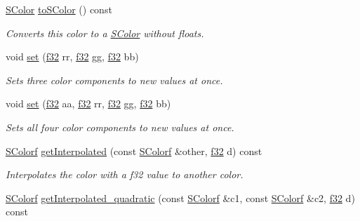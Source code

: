 \begin{DoxyCompactItemize}
\mbox{\label{classirr_1_1video_1_1SColorf_ac2f8bda88252139531ce041819aabee6}} 
\hyperlink{classirr_1_1video_1_1SColor}{S\+Color} \hyperlink{classirr_1_1video_1_1SColorf_ac2f8bda88252139531ce041819aabee6}{to\+S\+Color} () const
\begin{DoxyCompactList}\small\item\em Converts this color to a \hyperlink{classirr_1_1video_1_1SColor}{S\+Color} without floats. \end{DoxyCompactList}\item 
void \hyperlink{classirr_1_1video_1_1SColorf_a99fe5c7d261d288d9afe301d4b90d41c}{set} (\hyperlink{namespaceirr_a0277be98d67dc26ff93b1a6a1d086b07}{f32} rr, \hyperlink{namespaceirr_a0277be98d67dc26ff93b1a6a1d086b07}{f32} gg, \hyperlink{namespaceirr_a0277be98d67dc26ff93b1a6a1d086b07}{f32} bb)
\begin{DoxyCompactList}\small\item\em Sets three color components to new values at once. \end{DoxyCompactList}\item 
void \hyperlink{classirr_1_1video_1_1SColorf_ae5a082e95ff2631651356f8a6daa2e73}{set} (\hyperlink{namespaceirr_a0277be98d67dc26ff93b1a6a1d086b07}{f32} aa, \hyperlink{namespaceirr_a0277be98d67dc26ff93b1a6a1d086b07}{f32} rr, \hyperlink{namespaceirr_a0277be98d67dc26ff93b1a6a1d086b07}{f32} gg, \hyperlink{namespaceirr_a0277be98d67dc26ff93b1a6a1d086b07}{f32} bb)
\begin{DoxyCompactList}\small\item\em Sets all four color components to new values at once. \end{DoxyCompactList}\item 
\hyperlink{classirr_1_1video_1_1SColorf}{S\+Colorf} \hyperlink{classirr_1_1video_1_1SColorf_a43850552a0805bcdb8c246613d251cfb}{get\+Interpolated} (const \hyperlink{classirr_1_1video_1_1SColorf}{S\+Colorf} \&other, \hyperlink{namespaceirr_a0277be98d67dc26ff93b1a6a1d086b07}{f32} d) const
\begin{DoxyCompactList}\small\item\em Interpolates the color with a f32 value to another color. \end{DoxyCompactList}\item 
\hyperlink{classirr_1_1video_1_1SColorf}{S\+Colorf} \hyperlink{classirr_1_1video_1_1SColorf_ae75c258ce246833bde2cbeb6c1f786a5}{get\+Interpolated\+\_\+quadratic} (const \hyperlink{classirr_1_1video_1_1SColorf}{S\+Colorf} \&c1, const \hyperlink{classirr_1_1video_1_1SColorf}{S\+Colorf} \&c2, \hyperlink{namespaceirr_a0277be98d67dc26ff93b1a6a1d086b07}{f32} d) const

\end{DoxyCompactItemize}
